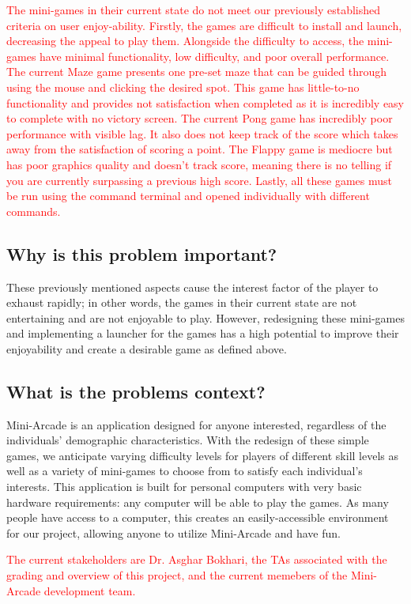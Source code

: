 \documentclass{article}
\begin{document}
\textcolor{red}{The mini-games in their current state do not meet our previously established criteria on user enjoy-ability. Firstly, the games are difficult to install and launch, decreasing the appeal to play them. Alongside the difficulty to access, the mini-games have minimal functionality, low difficulty, and poor overall performance. The current Maze game presents one pre-set maze that can be guided through using the mouse and clicking the desired spot. This game has little-to-no functionality and provides not satisfaction when completed as it is incredibly easy to complete with no victory screen. The current Pong game has incredibly poor performance with visible lag. It also does not keep track of the score which takes away from the satisfaction of scoring a point. The Flappy game is mediocre but has poor graphics quality and doesn't track score, meaning there is no telling if you are currently surpassing a previous high score. Lastly, all these games must be run using the command terminal and opened individually with different commands.}

\subsection{Why is this problem important?}
These previously mentioned aspects cause the interest factor of the player to exhaust rapidly; in other words, the games in their current state are not entertaining and are not enjoyable to play. However, redesigning these mini-games and implementing a launcher for the games has a high potential to improve their enjoyability and create a desirable game as defined above.

\subsection{What is the problems context?}
Mini-Arcade is an application designed for anyone interested, regardless of the individuals' demographic characteristics. With the redesign of these simple games, we anticipate varying difficulty levels for players of different skill levels as well as a variety of mini-games to choose from to satisfy each individual's interests. This application is built for personal computers with very basic hardware requirements: any computer will be able to play the games. As many people have access to a computer, this creates an easily-accessible environment for our project, allowing anyone to utilize Mini-Arcade and have fun.

\textcolor{red}{The current stakeholders are Dr. Asghar Bokhari, the TAs associated with the grading and overview of this project, and the current memebers of the Mini-Arcade development team.}
\end{document}
